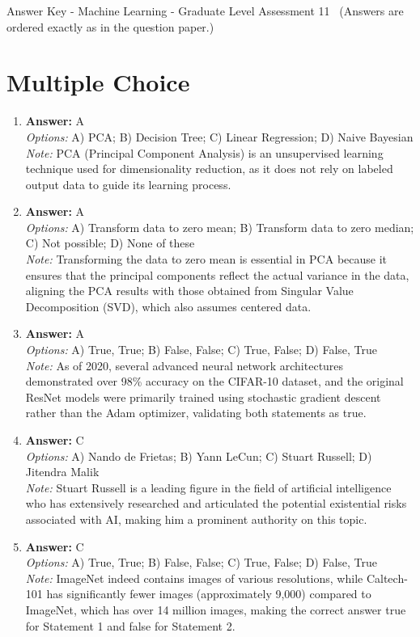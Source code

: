 \documentclass[12pt]{article}
\begin{document}
\begin{center}
Answer Key - Machine Learning - Graduate Level Assessment 11 \
\small (Answers are ordered exactly as in the question paper.)
\end{center}

\section*{Multiple Choice}
\begin{enumerate}[label=\arabic*.]
\item \textbf{Answer:} A
\\ \textit{Options:} A) PCA; B) Decision Tree; C) Linear Regression; D) Naive Bayesian
\\ \textit{Note:} PCA (Principal Component Analysis) is an unsupervised learning technique used for dimensionality reduction, as it does not rely on labeled output data to guide its learning process.
\item \textbf{Answer:} A
\\ \textit{Options:} A) Transform data to zero mean; B) Transform data to zero median; C) Not possible; D) None of these
\\ \textit{Note:} Transforming the data to zero mean is essential in PCA because it ensures that the principal components reflect the actual variance in the data, aligning the PCA results with those obtained from Singular Value Decomposition (SVD), which also assumes centered data.
\item \textbf{Answer:} A
\\ \textit{Options:} A) True, True; B) False, False; C) True, False; D) False, True
\\ \textit{Note:} As of 2020, several advanced neural network architectures demonstrated over 98\% accuracy on the CIFAR-10 dataset, and the original ResNet models were primarily trained using stochastic gradient descent rather than the Adam optimizer, validating both statements as true.
\item \textbf{Answer:} C
\\ \textit{Options:} A) Nando de Frietas; B) Yann LeCun; C) Stuart Russell; D) Jitendra Malik
\\ \textit{Note:} Stuart Russell is a leading figure in the field of artificial intelligence who has extensively researched and articulated the potential existential risks associated with AI, making him a prominent authority on this topic.
\item \textbf{Answer:} C
\\ \textit{Options:} A) True, True; B) False, False; C) True, False; D) False, True
\\ \textit{Note:} ImageNet indeed contains images of various resolutions, while Caltech-101 has significantly fewer images (approximately 9,000) compared to ImageNet, which has over 14 million images, making the correct answer true for Statement 1 and false for Statement 2.
\end{enumerate}
\end{document}
